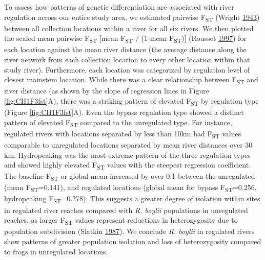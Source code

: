 \documentclass[twoside,12pt,final]{ucthesis-CA2012} %
\begin{document}
\begin{ucmainmatter}
To assess how patterns of genetic differentiation are associated with
river regulation across our entire study area, we estimated pairwise
F\textsubscript{ST} (Wright
\protect\hyperlink{ref-wright_isolation_1943}{1943}) between all
collection locations within a river for all six rivers. We then plotted
the scaled mean pairwise F\textsubscript{ST} {[}mean F\textsubscript{ST}
/ (1-mean F\textsubscript{ST}){]} (Rousset
\protect\hyperlink{ref-rousset_genetic_1997}{1997}) for each location
against the mean river distance (the average distance along the river
network from each collection location to every other location within
that study river). Furthermore, each location was categorized by
regulation level of closest mainstem location. While there was a clear
relationship between F\textsubscript{ST} and river distance (as shown by
the slope of regression lines in Figure \ref{fig:CH1F3fst}A), there was
a striking pattern of elevated F\textsubscript{ST} by regulation type
(Figure \ref{fig:CH1F3fst}A). Even the bypass regulation type showed a
distinct pattern of elevated F\textsubscript{ST} compared to the
unregulated type. For instance, regulated rivers with locations
separated by less than 10km had F\textsubscript{ST} values comparable to
unregulated locations separated by mean river distances over 30 km.
Hydropeaking was the most extreme pattern of the three regulation types
and showed highly elevated F\textsubscript{ST} values with the steepest
regression coefficient. The baseline F\textsubscript{ST} or global mean
increased by over 0.1 between the unregulated (mean
F\textsubscript{ST}=0.141), and regulated locations (global mean for
bypass F\textsubscript{ST}=0.256, hydropeaking
F\textsubscript{ST}=0.278). This suggests a greater degree of isolation
within sites in regulated river reaches compared with \emph{R. boylii}
populations in unregulated reaches, as larger F\textsubscript{ST} values
represent reductions in heterozygosity due to population subdivision
(Slatkin \protect\hyperlink{ref-slatkin_gene_1987}{1987}). We conclude
\emph{R. boylii} in regulated rivers show patterns of greater population
isolation and loss of heterozygosity compared to frogs in unregulated
locations.


\end{ucmainmatter}
\end{document}
